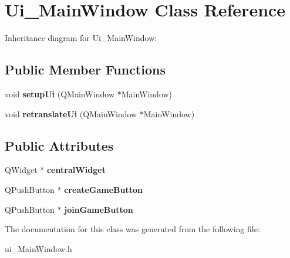 \hypertarget{classUi__MainWindow}{}\section{Ui\+\_\+\+Main\+Window Class Reference}
\label{classUi__MainWindow}


Inheritance diagram for Ui\+\_\+\+Main\+Window\+:
\subsection*{Public Member Functions}
\begin{DoxyCompactItemize}
\item 
\mbox{\label{classUi__MainWindow_acf4a0872c4c77d8f43a2ec66ed849b58}} 
void {\bfseries setup\+Ui} (Q\+Main\+Window $\ast$Main\+Window)
\item 
\mbox{\label{classUi__MainWindow_a097dd160c3534a204904cb374412c618}} 
void {\bfseries retranslate\+Ui} (Q\+Main\+Window $\ast$Main\+Window)
\end{DoxyCompactItemize}
\subsection*{Public Attributes}
\begin{DoxyCompactItemize}
\item 
\mbox{\label{classUi__MainWindow_a30075506c2116c3ed4ff25e07ae75f81}} 
Q\+Widget $\ast$ {\bfseries central\+Widget}
\item 
\mbox{\label{classUi__MainWindow_aa6e4ce6ea474de6cf6dc6282e765da91}} 
Q\+Push\+Button $\ast$ {\bfseries create\+Game\+Button}
\item 
\mbox{\label{classUi__MainWindow_a8dbff5140a0e4f318c57cfd4feb69428}} 
Q\+Push\+Button $\ast$ {\bfseries join\+Game\+Button}
\end{DoxyCompactItemize}


The documentation for this class was generated from the following file\+:\begin{DoxyCompactItemize}
\item 
ui\+\_\+\+Main\+Window.\+h\end{DoxyCompactItemize}
